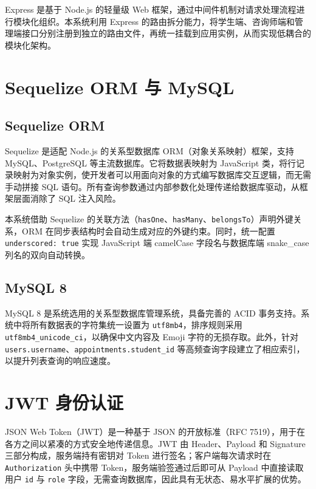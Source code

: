 Express 是基于 Node.js 的轻量级 Web 框架\cite{hahn2016}，通过中间件机制对请求处理流程进行模块化组织。本系统利用 Express 的路由拆分能力，将学生端、咨询师端和管理端接口分别注册到独立的路由文件，再统一挂载到应用实例，从而实现低耦合的模块化架构。

\section{Sequelize ORM 与 MySQL}

\subsection{Sequelize ORM}

Sequelize 是适配 Node.js 的关系型数据库 ORM（对象关系映射）框架\cite{seqdocs}，支持 MySQL、PostgreSQL 等主流数据库。它将数据表映射为 JavaScript 类，将行记录映射为对象实例，使开发者可以用面向对象的方式编写数据库交互逻辑，而无需手动拼接 SQL 语句。所有查询参数通过内部参数化处理传递给数据库驱动，从框架层面消除了 SQL 注入风险。

本系统借助 Sequelize 的关联方法（\texttt{hasOne}、\texttt{hasMany}、\texttt{belongsTo}）声明外键关系，ORM 在同步表结构时会自动生成对应的外键约束。同时，统一配置 \texttt{underscored: true} 实现 JavaScript 端 camelCase 字段名与数据库端 snake\_case 列名的双向自动转换。

\subsection{MySQL 8}

MySQL 8 是系统选用的关系型数据库管理系统\cite{mysql80docs}，具备完善的 ACID 事务支持。系统中将所有数据表的字符集统一设置为 \texttt{utf8mb4}，排序规则采用 \texttt{utf8mb4\_unicode\_ci}，以确保中文内容及 Emoji 字符的无损存取。此外，针对 \texttt{users.username}、\texttt{appointments.student\_id} 等高频查询字段建立了相应索引，以提升列表查询的响应速度。

\section{JWT 身份认证}

JSON Web Token（JWT）是一种基于 JSON 的开放标准（RFC 7519）\cite{jones2015}，用于在各方之间以紧凑的方式安全地传递信息。JWT 由 Header、Payload 和 Signature 三部分构成，服务端持有密钥对 Token 进行签名；客户端每次请求时在 \texttt{Authorization} 头中携带 Token，服务端验签通过后即可从 Payload 中直接读取用户 \texttt{id} 与 \texttt{role} 字段，无需查询数据库，因此具有无状态、易水平扩展的优势。

